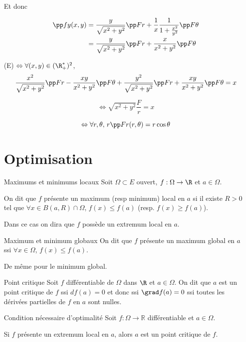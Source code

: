 Et donc 

\begin{align}
    \pp f y (x, y) & = \frac y {\sqrt{x^2 + y^2}} \pp F r + \frac 1 x \frac{1}{1 + \frac{x^2}{y^2}} \pp F \theta \\
    & = \frac y {\sqrt{x^2 + y^2}} \pp F r + \frac x {x^2 + y^2} \pp F \theta
\end{align}

(E) $ \Leftrightarrow \forall (x, y) \in (\R_+^*)^2$,
$$ \frac{x^2 }{\sqrt{x^2 + y^2}} \pp F r - \frac{xy}{x^2 + y^2} \pp F \theta + \frac{y^2}{\sqrt{x^2 + y^2}} \pp F r + \frac{xy}{x^2 + y^2} \pp F \theta = x$$

$$\Leftrightarrow \sqrt{x^2 + y^2} \frac F r = x$$

$$\Leftrightarrow \forall r, \theta, \, r \pp F r (r, \theta) = r \cos \theta$$


\section{Optimisation }

\begin{definition}{Maximums et minimums locaux}{}
    Soit $\Omega \subset E$ ouvert, $f : \Omega \to \R$ et $a \in \Omega$.

    On dit que $f$ présente un maximum (resp minimum) local en $a$ si il existe $R > 0$ 
    tel que $\forall x \in B(a, R) \cap \Omega$, $f(x) \leqslant f(a)$ (resp. $f(x) \geqslant f(a)$).

    Dans ce cas on dira que $f$ possède un extremum local en $a$. 
\end{definition}

\begin{definition}{Maximum et minimum globaux}{}
    On dit que $f$ présente un maximum global en $a$ ssi $\forall x \in \Omega$, $f(x) \leqslant f(a)$.

    De même pour le minimum global.
\end{definition}

\begin{definition}{Point critique}{}
    Soit $f$ différentiable de $\Omega$ dans $\R$ et $a \in \Omega$. On dit que $a$ est un point critique de $f$ ssi
    $df(a) = 0$ et donc ssi $\grad f(a) = 0$ ssi toutes les dérivées partielles de $f$ en $a$ sont nulles.
\end{definition}

\begin{theoreme}{Condition nécessaire d'optimalité}{}
    Soit $f : \Omega \to \mathbb R$ différentiable et $a \in \Omega$. 

    Si $f$ présente un extremum local en $a$, alors $a$ est un point critique de $f$.
\end{theoreme}

